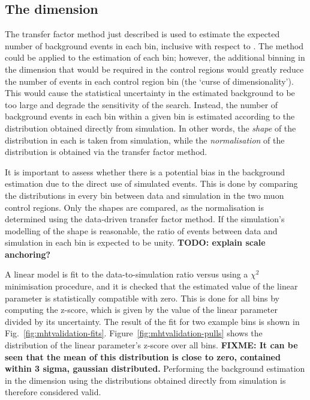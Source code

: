 \subsection{The \mht dimension}
\label{sec:analysis-estimation-mht}

The transfer factor method just described is used to estimate the expected 
number of background events in each \njnbht bin, inclusive with respect to 
\mht. 
The method could be applied to the estimation of each \njnbhtmht bin; however, 
the additional binning in the \mht dimension that would be required in the 
control regions would greatly reduce the number of events in each control 
region bin (the `curse of dimensionality'). This would cause the statistical 
uncertainty in the estimated background to be too large and degrade the 
sensitivity of the search. 
Instead, the number of background events in each \mht bin within a given 
\njnbht bin is estimated according to the \mht distribution obtained directly 
from simulation. 
In other words, the \textit{shape} of the \mht distribution in each \njnbht is 
taken from simulation, while the \textit{normalisation} of the distribution is 
obtained via the transfer factor method.

It is important to assess whether there is a potential bias in the background 
estimation due to the direct use of simulated events.
This is done by comparing the \mht distributions in every \njnbht bin between 
data and simulation in the two muon control regions. Only the shapes are 
compared, as the normalisation is determined using the data-driven transfer 
factor method. If the simulation's modelling of the \mht shape is reasonable, 
the ratio of events between data and simulation in each \mht bin is expected to 
be unity.
\textbf{TODO: explain scale anchoring?}

A linear model is fit to the data-to-simulation ratio versus \mht using a 
$\chi^2$ minimisation procedure, and it is checked that the estimated value of 
the linear parameter is statistically compatible with zero. This is done for 
all \njnbht bins by computing the z-score, which is given by the value of the 
linear parameter divided by its uncertainty. The result of the fit for two 
example \njnbht bins is shown in Fig.~\ref{fig:mhtvalidation-fits}. 
Figure~\ref{fig:mhtvalidation-pulls} shows the distribution of the linear 
parameter's z-score over all \njnbht bins. 
\textbf{FIXME: It can be seen that the mean of this distribution is close to 
zero, contained within 3 sigma, gaussian distributed.}
Performing the background estimation in the \mht dimension using the 
distributions obtained directly from simulation is therefore considered valid.

